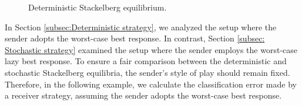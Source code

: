 \begin{exg}
\begin{figure}
        \caption{Deterministic Stackelberg equilibrium.}
	\end{figure}
\end{exg}

In Section \ref{subsec:Deterministic strategy}, we analyzed the setup where the sender adopts the worst-case best response. In contrast, Section \ref{subsec: Stochastic strategy} examined the setup where the sender employs the worst-case lazy best response. To ensure a fair comparison between the deterministic and stochastic Stackelberg equilibria, the sender's style of play should remain fixed. Therefore, in the following example, we calculate the classification error made by a receiver strategy, assuming the sender adopts the worst-case best response.


